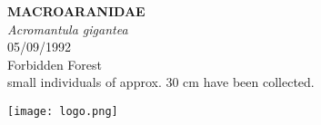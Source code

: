 \documentclass[
  landscape]{article}
\begin{document}
\begin{mdframed}[linecolor=mycolortext, linewidth=2pt, backgroundcolor=mycolor]

  \bigskip
  \begin{flushright}
  \begin{minipage}[t][-50ex][t]{16em}  
  \end{minipage}
  \end{flushright}
  \bigskip
  \begin{adjustwidth}{1cm}{1cm}
  {\fontsize{50pt}{0pt}\selectfont\bf\textcolor{mycolortext}{ MACROARANIDAE }} \\
  \linebreak
  \linebreak
  {\fontsize{40pt}{100pt}\selectfont\textcolor{mycolortext}{\emph{ Acromantula gigantea }}} \\
  \vfill
  {\fontsize{30pt}{100pt}\selectfont\textcolor{mycolortext}{ 05/09/1992 }} \\
  \vfill
  {\fontsize{30pt}{100pt}\selectfont\textcolor{mycolortext}{ Forbidden Forest }} \\
  \vfill
  {\fontsize{30pt}{50pt}\selectfont\textcolor{mycolortext}{ small individuals of approx. 30 cm have been collected. }} \\
  \end{adjustwidth}
  \begin{center}
  \texttt{[image: logo.png]}
  \end{center}
  \end{mdframed}
  \pagebreak

\end{document}
